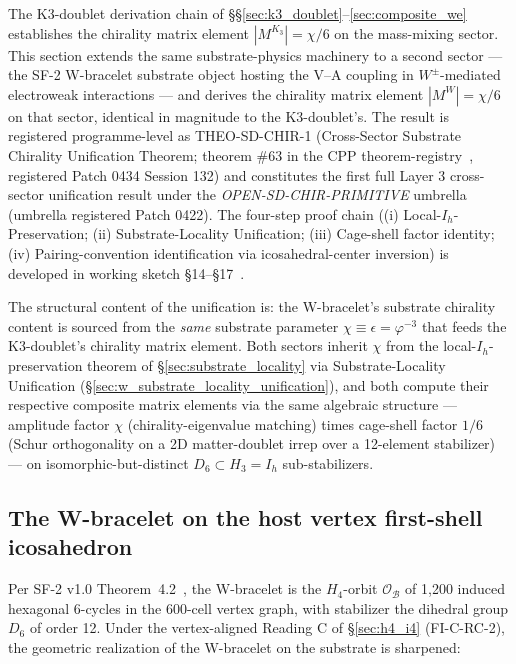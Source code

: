\documentclass[11pt,letterpaper]{article}
\newcommand{\phig}{\varphi}
\newcommand{\Kthree}{\ensuremath{K_3}}
\newcommand{\Dsix}{D_6}
\newcommand{\Hfour}{H_4}
\begin{document}
The K3-doublet derivation chain of \S\S\ref{sec:k3_doublet}--\ref{sec:composite_we} establishes the chirality matrix element $|M^{\Kthree}| = \chi/6$ on the mass-mixing sector. This section extends the same substrate-physics machinery to a second sector --- the SF-2 W-bracelet substrate object hosting the V--A coupling in $W^\pm$-mediated electroweak interactions --- and derives the chirality matrix element $|M^W| = \chi/6$ on that sector, identical in magnitude to the K3-doublet's. The result is registered programme-level as THEO-SD-CHIR-1 (Cross-Sector Substrate Chirality Unification Theorem; theorem \#63 in the CPP theorem-registry~\cite{abshier_theorem_registry}, registered Patch 0434 Session 132) and constitutes the first full Layer 3 cross-sector unification result under the \emph{OPEN-SD-CHIR-PRIMITIVE} umbrella~\cite{abshier_research_frontier} (umbrella registered Patch 0422). The four-step proof chain ((i) Local-$I_h$-Preservation; (ii) Substrate-Locality Unification; (iii) Cage-shell factor identity; (iv) Pairing-convention identification via icosahedral-center inversion) is developed in working sketch \S14--\S17~\cite{abshier_capotauro_chiral_mechanism_sketch}.

The structural content of the unification is: the W-bracelet's substrate chirality content is sourced from the \emph{same} substrate parameter $\chi \equiv \epsilon = \phig^{-3}$ that feeds the K3-doublet's chirality matrix element. Both sectors inherit $\chi$ from the local-$I_h$-preservation theorem of \S\ref{sec:substrate_locality} via Substrate-Locality Unification (\S\ref{sec:w_substrate_locality_unification}), and both compute their respective composite matrix elements via the same algebraic structure --- amplitude factor $\chi$ (chirality-eigenvalue matching) times cage-shell factor $1/6$ (Schur orthogonality on a 2D matter-doublet irrep over a 12-element stabilizer) --- on isomorphic-but-distinct $\Dsix \subset H_3 = I_h$ sub-stabilizers.

\subsection{The W-bracelet on the host vertex first-shell icosahedron}\label{sec:w_bracelet_setup}

Per SF-2 v1.0 Theorem~4.2~\cite{abshier_sf2}, the W-bracelet is the $\Hfour$-orbit $\mathcal{O}_\mathcal{B}$ of 1{,}200 induced hexagonal 6-cycles in the 600-cell vertex graph, with stabilizer the dihedral group $\Dsix$ of order 12. Under the vertex-aligned Reading C of \S\ref{sec:h4_i4} (FI-C-RC-2), the geometric realization of the W-bracelet on the substrate is sharpened:
\end{document}
